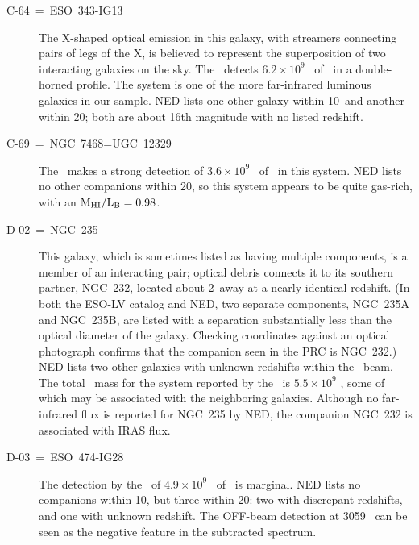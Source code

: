 \begin{description}
\item[C-64~=~ESO~343-IG13] 
The X-shaped optical emission in this galaxy,
with streamers connecting pairs of legs of the X, is believed to 
represent the superposition of two interacting galaxies on the sky.  
The \ detects $6.2 \times 10^9$ \MSUN\ of \HI\ in a double-horned 
profile.  The system is one of 
the more far-infrared luminous galaxies in our sample.  NED lists one 
other galaxy within 10\AMIN\ and another within 20\AMIN; both are about 
16th magnitude with no listed redshift.   

\item[C-69~=~NGC~7468=UGC~12329] 
The \ makes a strong detection of $3.6 \times 10^9$ \MSUN\ of \HI\ in 
this system.  NED lists no other companions within 20\AMIN, so this system 
appears to be quite gas-rich, with an $\rm M_{\rm HI}/L_{B} = 0.98$.

\item[D-02~=~NGC~235]
This galaxy, which is sometimes listed as having multiple components, 
is a member of an interacting pair; optical debris 
connects it to its southern partner, NGC~232, located about 2\AMIN\ 
away at a nearly identical redshift.  (In both 
the ESO-LV catalog and NED, two separate components,  
NGC~235A and NGC~235B, are listed with a separation substantially less 
than the optical diameter of the galaxy.  
Checking coordinates against an optical photograph confirms  
that the companion seen in the PRC is NGC~232.)    
NED lists two other galaxies with unknown redshifts within the \ beam.  
The total \HI\ mass for the system reported by the \GB140\ is 
$5.5 \times 10^9$ \MSUN, some of which may be associated with the neighboring 
galaxies.  Although no far-infrared flux is reported for NGC~235 
by NED, the companion NGC~232 is associated with IRAS flux. 

\item[D-03~=~ESO~474-IG28]
The detection by the \ of $4.9 \times 10^9$ \MSUN\ of \HI\ is marginal.  
NED lists no companions within 10\AMIN, but three within 20\AMIN:  two with 
discrepant redshifts, and one with unknown redshift.  
The OFF-beam detection at 3059 \KMS\ can be seen as the negative feature 
in the subtracted spectrum.  


\end{description}
